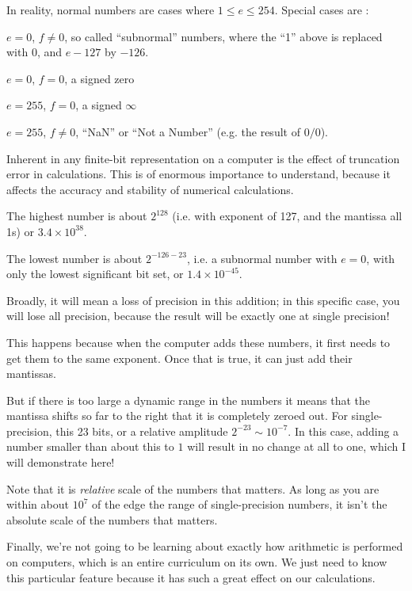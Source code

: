 In reality, normal numbers are cases where $1\le e \le 254$. Special
cases are :
\begin{ditemize}
\item $e=0$, $f\ne 0$, so called ``subnormal'' numbers, where the
  ``1'' above is replaced with 0, and $e-127$ by $-126$.
\item $e=0$, $f=0$, a signed zero
\item $e=255$, $f=0$, a signed $\infty$
\item $e=255$, $f\ne 0$, ``NaN'' or ``Not a Number'' (e.g. the result
  of $0/0$).
\end{ditemize}

Inherent in any finite-bit representation on a computer is the effect
of truncation error in calculations. This is of enormous importance to
understand, because it affects the accuracy and stability of numerical
calculations. 


\begin{answer}
The highest number is about $2^{128}$ (i.e. with exponent of 127, and
the mantissa all 1s) or $3.4\times 10^{38}$. 

The lowest number is about $2^{-126 -23}$, i.e. a subnormal number
with $e=0$, with only the lowest significant bit set, or $1.4\times
10^{-45}$. 
\end{answer}


\begin{answer}
Broadly, it will mean a loss of precision in this addition; in this
specific case, you will lose all precision, because the result will be
exactly one at single precision!

This happens because when the computer adds these numbers, it first
needs to get them to the same exponent. Once that is true, it can just
add their mantissas. 

But if there is too large a dynamic range in the numbers it means that
the mantissa shifts so far to the right that it is completely zeroed
out. For single-precision, this 23 bits, or a relative amplitude
$2^{-23} \sim 10^{-7}$. In this case, adding a number smaller than
about this to $1$ will result in no change at all to one, which I will
demonstrate here!

Note that it is {\it relative} scale of the numbers that matters. As
long as you are within about $10^7$ of the edge the range of
single-precision numbers, it isn't the absolute scale of the numbers
that matters.

Finally, we're not going to be learning about exactly how arithmetic
is performed on computers, which is an entire curriculum on its own.
We just need to know this particular feature because it has such a
great effect on our calculations.
\end{answer}

